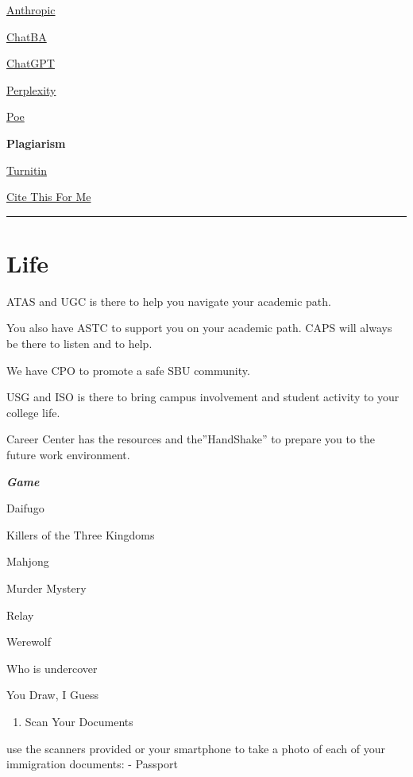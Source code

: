 \documentclass[
]{book}
\providecommand{\tightlist}{%
  \setlength{\itemsep}{0pt}\setlength{\parskip}{0pt}}
\begin{document}
\href{https://claude.ai/login?returnTo=\%2F}{Anthropic}

\href{https://www.chatba.com/}{ChatBA}

\href{https://chat.openai.com/}{ChatGPT}

\href{https://www.perplexity.ai/}{Perplexity}

\href{https://poe.com/login}{Poe}

\textbf{Plagiarism}

\href{https://www.turnitin.com/}{Turnitin}

\href{https://www.citethisforme.com/}{Cite This For Me}

\begin{center}\rule{0.5\linewidth}{0.5pt}\end{center}

\hypertarget{life}{%
\chapter{Life}\label{life}}

ATAS and UGC is there to help you navigate your academic path.

You also have ASTC to support you on your academic path. CAPS will always be there to listen and to help.

We have CPO to promote a safe SBU community.

USG and ISO is there to bring campus involvement and student activity to your college life.

Career Center has the resources and the''HandShake'' to prepare you to the future work environment.

\textbf{\emph{Game}}

Daifugo

Killers of the Three Kingdoms

Mahjong

Murder Mystery

Relay

Werewolf

Who is undercover

You Draw, I Guess

\begin{enumerate}
\def\labelenumi{\arabic{enumi}.}
\tightlist
\item
  Scan Your Documents
\end{enumerate}

use the scanners provided or your smartphone to take a photo of each of your immigration documents:
- Passport
\end{document}
